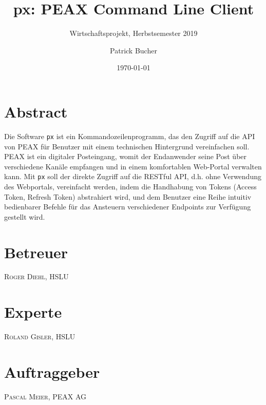 \author{Patrick Bucher}
\title{px: PEAX Command Line Client}
\subtitle{Wirtschaftsprojekt, Herbstsemester 2019}
\date{\today}
\maketitle

\section*{Abstract}

Die Software \texttt{px} ist ein Kommandozeilenprogramm, das den Zugriff auf die API von PEAX für Benutzer mit einem technischen Hintergrund vereinfachen soll. PEAX ist ein digitaler Posteingang, womit der Endanwender seine Post über verschiedene Kanäle empfangen und in einem komfortablen Web-Portal verwalten kann. Mit \texttt{px} soll der direkte Zugriff auf die RESTful API, d.h. ohne Verwendung des Webportals, vereinfacht werden, indem die Handhabung von Tokens (Access Token, Refresh Token) abstrahiert wird, und dem Benutzer eine Reihe intuitiv bedienbarer Befehle für das Ansteuern verschiedener Endpoints zur Verfügung gestellt wird.

\vfill

\begin{multicols}{3}
\section*{Betreuer}
\textsc{Roger Diehl}, HSLU
\columnbreak
\section*{Experte}
\textsc{Roland Gisler}, HSLU
\columnbreak
\section*{Auftraggeber}
\textsc{Pascal Meier}, PEAX AG
\end{multicols}
